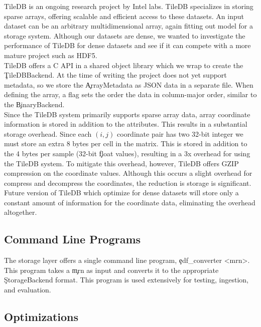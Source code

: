 TileDB \cite{tiledb} is an ongoing research project by Intel labs. TileDB
specializes in storing sparse arrays, offering scalable and efficient access to
these datasets. An input dataset can be an arbitrary multidimensional array,
again fitting out model for a storage system. Although our datasets are dense,
we wanted to investigate the performance of TileDB for dense datasets and see
if it can compete with a more mature project such as HDF5.\\

TileDB offers a C API in a shared object library which we wrap to create the
\c{TileDBBackend}. At the time of writing the project does not yet support
metadata, so we store the \c{ArrayMetadata} as JSON data in a separate file.
When defining the array, a flag sets the order the data in column-major order,
similar to the \c{BinaryBackend}. \\

Since the TileDB system primarily supports sparse array data, array coordinate
information is stored in addition to the attributes. This results in a
substantial storage overhead. Since each $(i, j)$ coordinate pair has two
32-bit integer we must store an extra 8 bytes per cell in the matrix. This is
stored in addition to the 4 bytes per sample (32-bit \c{float} values),
resulting in a 3x overhead for using the TileDB system. To mitigate this
overhead, however, TileDB offers GZIP compression on the coordinate values.
Although this occurs a slight overhead for compress and decompress the coordinates,
the reduction is storage is significant. \\

Future version of TileDB which optimize for dense datasets will store only a
constant amount of information for the coordinate data, eliminating the
overhead altogether.

\subsection{Command Line Programs}\label{storage-ch:implementation-cmd}

The storage layer offers a single command line program,
\c{edf\_converter <mrn>}.  This program takes a \c{mrn} as input
and converts it to the appropriate \c{StorageBackend} format. This
program is used extensively for testing, ingestion, and evaluation.

\subsection{Optimizations}\label{storage-ch:opt}

